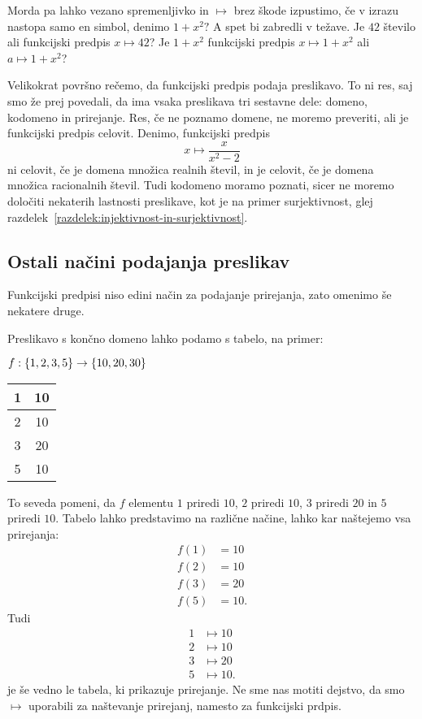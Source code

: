 Morda pa lahko vezano spremenljivko in $\mapsto$ brez škode izpustimo, če v izrazu nastopa
samo en simbol, denimo $1 + x^2?$
%
A spet bi zabredli v težave. Je $42$ število ali funkcijski predpis $x \mapsto 42$? Je
$1 + x^2$ funkcijski predpis $x \mapsto 1 + x^2$ ali $a \mapsto 1 + x^2$?

Velikokrat površno rečemo, da funkcijski predpis podaja preslikavo. To ni res, saj smo že
prej povedali, da ima vsaka preslikava tri sestavne dele: domeno, kodomeno in prirejanje.
Res, če ne poznamo domene, ne moremo preveriti, ali je funkcijski predpis celovit. Denimo,
funkcijski predpis
%
\begin{equation*}
  x \mapsto \frac{x}{x^2 - 2}
\end{equation*}
%
ni celovit, če je domena množica realnih števil, in je celovit, če je domena množica
racionalnih števil. Tudi kodomeno moramo poznati, sicer ne moremo določiti nekaterih
lastnosti preslikave, kot je na primer surjektivnost, glej
razdelek~\ref{razdelek:injektivnost-in-surjektivnost}.



\subsection{Ostali načini podajanja preslikav}
\label{sec:ostali-predpisi}

Funkcijski predpisi niso edini način za podajanje prirejanja, zato omenimo še nekatere
druge.

Preslikavo s končno domeno lahko podamo s tabelo, na primer:
%
\begin{center}
  $f : \set{1, 2, 3, 5} \to \set{10, 20, 30}$

  \medskip

  \begin{tabular}{|c|c|} \hline
    1 & 10 \\ \hline
    2 & 10 \\ \hline
    3 & 20 \\ \hline
    5 & 10 \\ \hline
  \end{tabular}
\end{center}
%
To seveda pomeni, da $f$ elementu $1$ priredi $10$, $2$ priredi $10$, $3$ priredi $20$ in $5$
priredi $10$. Tabelo lahko predstavimo na različne načine, lahko kar naštejemo vsa prirejanja:
%
\begin{align*}
  f(1) &= 10 \\
  f(2) &= 10 \\
  f(3) &= 20 \\
  f(5) &= 10.
\end{align*}
%
Tudi
%
\begin{align*}
  1 &\mapsto 10 \\
  2 &\mapsto 10 \\
  3 &\mapsto 20 \\
  5 &\mapsto 10.
\end{align*}
%
je še vedno le tabela, ki prikazuje prirejanje. Ne sme nas motiti dejstvo, da smo
$\mapsto$ uporabili za naštevanje prirejanj, namesto za funkcijski prdpis.

